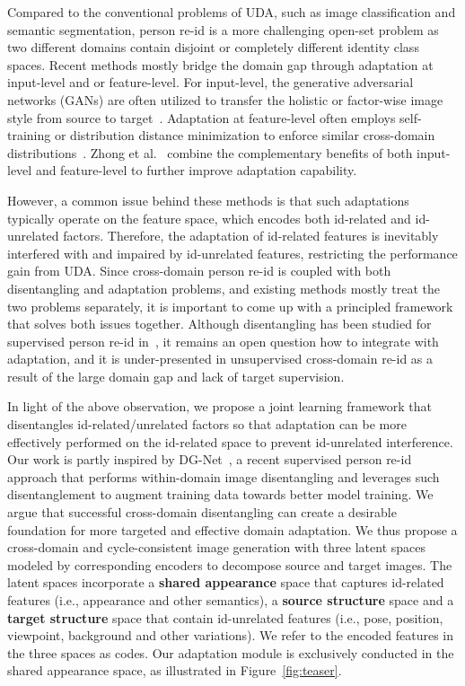\documentclass[runningheads]{llncs}
\begin{document}
Compared to the conventional problems of UDA, such as image classification and semantic segmentation, person re-id is a more challenging open-set problem as two different domains contain disjoint or completely different identity class spaces. Recent methods mostly bridge the domain gap through adaptation at input-level and or feature-level. For input-level, the generative adversarial networks (GANs) are often utilized to transfer the holistic or factor-wise image style from source to target~\cite{deng2018image,adaptive-transfer}. Adaptation at feature-level often employs self-training or distribution distance minimization to enforce similar cross-domain distributions~\cite{linmulti,wang2018transferable}. Zhong et al.~\cite{zhunzhong2018eccv} combine the complementary benefits of both input-level and feature-level to further improve adaptation capability. 

However, a common issue behind these methods is that such adaptations typically operate on the feature space, which encodes both id-related and id-unrelated factors. Therefore, the adaptation of id-related features is inevitably interfered with and impaired by id-unrelated features, restricting the performance gain from UDA. Since cross-domain person re-id is coupled with both disentangling and adaptation problems, and existing methods mostly treat the two problems separately, it is important to come up with a principled framework that solves both issues together. Although disentangling has been studied for supervised person re-id in~\cite{eom2019learning,zheng2019joint}, it remains an open question how to integrate with adaptation, and it is under-presented in unsupervised cross-domain re-id as a result of the large domain gap and lack of target supervision.


In light of the above observation, we propose a joint learning framework that disentangles id-related/unrelated factors so that adaptation can be more effectively performed on the id-related space to prevent id-unrelated interference. Our work is partly inspired by DG-Net~\cite{zheng2019joint}, a recent supervised person re-id approach that performs within-domain image disentangling and leverages such disentanglement to augment training data towards better model training. 
We argue that successful cross-domain disentangling can create a desirable foundation for more targeted and effective domain adaptation.
We thus propose a cross-domain and cycle-consistent image generation with three latent spaces modeled by corresponding encoders to decompose source and target images. The latent spaces incorporate a \textbf{shared appearance} space that captures id-related features (i.e., appearance and other semantics), a \textbf{source structure} space and a \textbf{target structure} space that contain id-unrelated features (i.e., pose, position, viewpoint, background and other variations). We refer to the encoded features in the three spaces as codes. Our adaptation module is exclusively conducted in the shared appearance space, as illustrated in Figure~\ref{fig:teaser}. 
\end{document}
